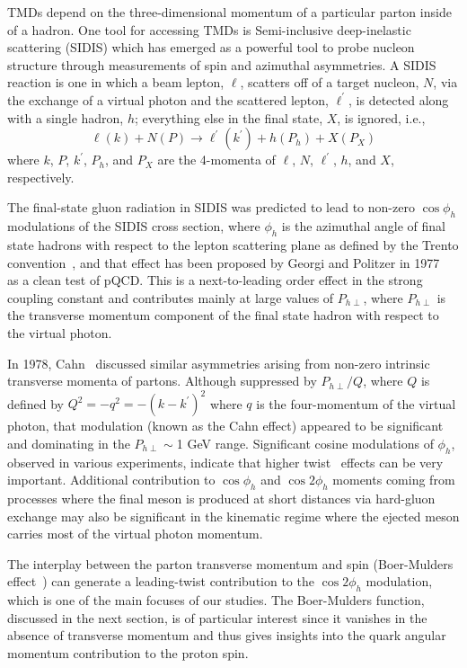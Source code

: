 \documentclass[aps,prl,twocolumn,showpacs,superscriptaddress,groupedaddress]{revtex4-1}  %
\newcommand{\Phperp}{P_{h\perp}}
\begin{document}
TMDs depend on the three-dimensional momentum of a particular parton inside of a hadron.
One tool for accessing TMDs is Semi-inclusive deep-inelastic scattering (SIDIS) which has emerged as a powerful tool to probe nucleon structure through measurements of spin and azimuthal asymmetries.
A SIDIS reaction is one in which a beam lepton, $\ell$, scatters off of a target nucleon, $N$, via the exchange of a virtual photon and the scattered lepton, $\ell^{\prime}$, is detected along with a single hadron, $h$; everything else in the final state, $X$, is ignored, i.e.,
\begin{equation}
\label{eq:sidis}
\ell (k) + N(P) \rightarrow \ell^{\prime} (k^{\prime} ) + h(P_{h}) + X(P_{X})
\end{equation}
where $k$, $P$, $k^{\prime}$, $P_{h}$, and $P_{X}$ are the 4-momenta of $\ell$, $N$, $\ell^{\prime}$, $h$, and $X$, respectively.

The final-state gluon radiation in SIDIS was predicted to lead to non-zero $\cos\phi_h$ modulations of the SIDIS cross section,
where $\phi_h$ is the azimuthal angle of final state hadrons with respect to the lepton scattering plane as defined by the Trento convention~\cite{Bacchetta:2004jz},
and that effect has been  proposed by Georgi and Politzer in  1977~\cite{Georgi:1977tv}  as a clean test of pQCD.
This is a next-to-leading order effect in the strong coupling constant and contributes mainly at large values of $\Phperp$, where $\Phperp$ is the transverse momentum component of the final state hadron with respect to the virtual photon.

In 1978, Cahn~\cite{Cahn:1978se}   discussed  similar asymmetries arising from non-zero intrinsic transverse momenta of partons.
Although suppressed by $P_{h\perp}/Q$, where $Q$ is defined by $Q^2 = -q^2 = -(k-k^\prime)^2$ where $q$ is the four-momentum of the virtual photon, that modulation (known as the Cahn effect) appeared to be significant and dominating in the $P_{h\perp} \sim $1 GeV range.
Significant cosine modulations of $\phi_h$, observed in various experiments, indicate that higher twist~\cite{Jaffe:1996zw} effects can be very important.
Additional contribution to $\cos \phi_h$ and $\cos 2\phi_h$ moments coming from processes where the final meson
is produced at short distances via hard-gluon exchange \cite{Berger:1979xz} may also be 
significant in the kinematic regime where the ejected meson carries  most of 
the virtual photon momentum.

The interplay between the parton transverse momentum and spin (Boer-Mulders effect~\cite{Boer:1997nt}) can generate a leading-twist
contribution to the $\cos 2\phi_h$ modulation, which is one of the main focuses of our studies.
The Boer-Mulders function, discussed in the next section, is of particular interest since it vanishes in the absence of transverse momentum and thus gives insights into the quark angular momentum contribution to the proton spin.
\end{document}
